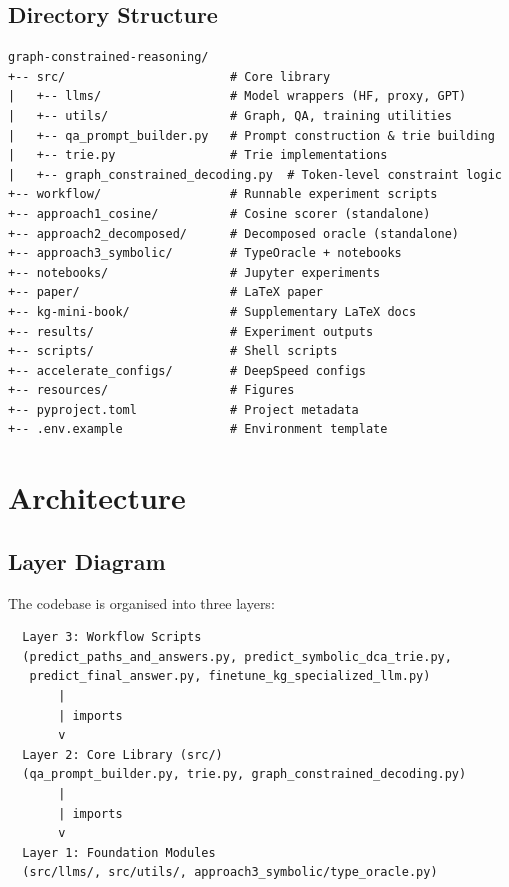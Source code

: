 \documentclass[11pt,a4paper,oneside,openany]{book}
\theoremstyle{definition}
\begin{document}
\section{Directory Structure}

\begin{lstlisting}[numbers=none,frame=none]
graph-constrained-reasoning/
+-- src/                       # Core library
|   +-- llms/                  # Model wrappers (HF, proxy, GPT)
|   +-- utils/                 # Graph, QA, training utilities
|   +-- qa_prompt_builder.py   # Prompt construction & trie building
|   +-- trie.py                # Trie implementations
|   +-- graph_constrained_decoding.py  # Token-level constraint logic
+-- workflow/                  # Runnable experiment scripts
+-- approach1_cosine/          # Cosine scorer (standalone)
+-- approach2_decomposed/      # Decomposed oracle (standalone)
+-- approach3_symbolic/        # TypeOracle + notebooks
+-- notebooks/                 # Jupyter experiments
+-- paper/                     # LaTeX paper
+-- kg-mini-book/              # Supplementary LaTeX docs
+-- results/                   # Experiment outputs
+-- scripts/                   # Shell scripts
+-- accelerate_configs/        # DeepSpeed configs
+-- resources/                 # Figures
+-- pyproject.toml             # Project metadata
+-- .env.example               # Environment template
\end{lstlisting}

\chapter{Architecture}\label{ch:architecture}

\section{Layer Diagram}

The codebase is organised into three layers:

\begin{verbatim}
  Layer 3: Workflow Scripts
  (predict_paths_and_answers.py, predict_symbolic_dca_trie.py,
   predict_final_answer.py, finetune_kg_specialized_llm.py)
       |
       | imports
       v
  Layer 2: Core Library (src/)
  (qa_prompt_builder.py, trie.py, graph_constrained_decoding.py)
       |
       | imports
       v
  Layer 1: Foundation Modules
  (src/llms/, src/utils/, approach3_symbolic/type_oracle.py)
\end{verbatim}
\end{document}

